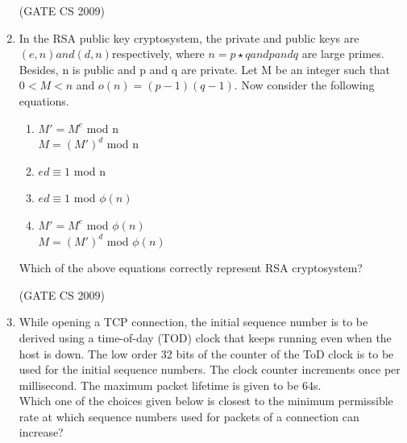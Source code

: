 \documentclass[a4paper, 11pt]{article}
\begin{document}
\begin{enumerate}
    \hfill (GATE CS 2009)

    \item In the RSA public key cryptosystem, the private and public keys are $(e, n) and (d, n)$respectively, where $n=p\star q and p and q$ are large primes. Besides, n is public and p and q are private. Let M be an integer such that $0<M<n$ and $o(n)=(p-1)(q-1)$. Now consider the following equations.\\
    \begin{enumerate}[label=\Roman*]
        \item $M' = M^e$  mod n\\ $M = (M')^d$ mod n
        \item $ed \equiv 1 $ mod n
        \item $ed \equiv 1 $ mod $\phi(n)$
        \item $M' = M^e$  mod $\phi(n)$\\ $M = (M')^d$  mod $\phi(n)$
    \end{enumerate}
    Which of the above equations correctly represent RSA cryptosystem?

    \begin{enumerate}
    \end{enumerate}

    \hfill (GATE CS 2009)
    
     \item While opening a TCP connection, the initial sequence number is to be derived using a time-of-day (TOD) clock that keeps running even when the host is down. The low order 32 bits of the counter of the ToD clock is to be used for the initial sequence numbers. The clock counter increments once per millisecond. The maximum packet lifetime is given to be 64s.\\
    Which one of the choices given below is closest to the minimum permissible rate at which sequence numbers used for packets of a connection can increase?
    \begin{enumerate}
    \end{enumerate}
    

\end{enumerate}
\end{document}
